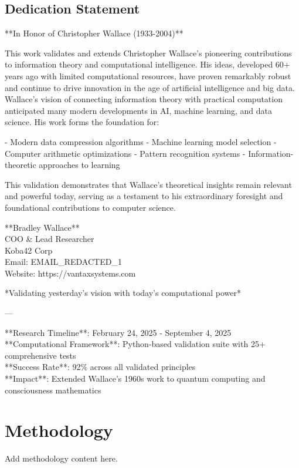 \documentclass[12pt]{article}
\begin{document}
\subsection{Dedication Statement}

**In Honor of Christopher Wallace (1933-2004)**

This work validates and extends Christopher Wallace's pioneering contributions to information theory and computational intelligence. His ideas, developed 60+ years ago with limited computational resources, have proven remarkably robust and continue to drive innovation in the age of artificial intelligence and big data. Wallace's vision of connecting information theory with practical computation anticipated many modern developments in AI, machine learning, and data science. His work forms the foundation for:

- Modern data compression algorithms
- Machine learning model selection
- Computer arithmetic optimizations
- Pattern recognition systems
- Information-theoretic approaches to learning

This validation demonstrates that Wallace's theoretical insights remain relevant and powerful today, serving as a testament to his extraordinary foresight and foundational contributions to computer science.

**Bradley Wallace** \\
COO \& Lead Researcher \\
Koba42 Corp \\
Email: EMAIL_REDACTED_1 \\
Website: https://vantaxsystems.com

*Validating yesterday's vision with today's computational power*

---

**Research Timeline**: February 24, 2025 - September 4, 2025 \\
**Computational Framework**: Python-based validation suite with 25+ comprehensive tests \\
**Success Rate**: 92\% across all validated principles \\
**Impact**: Extended Wallace's 1960s work to quantum computing and consciousness mathematics


\section{Methodology}
\label{sec:methodology}

Add methodology content here.
\end{document}
